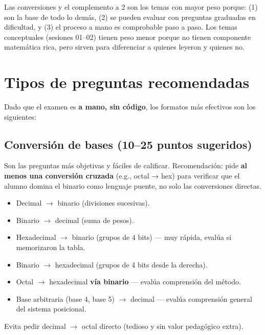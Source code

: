 \documentclass[12pt, oneside]{article}
\begin{document}
\begin{notaprofesor}
  Las conversiones y el complemento a 2 son los temas con mayor peso porque:
  (1) son la base de todo lo demás, (2) se pueden evaluar con preguntas
  graduadas en dificultad, y (3) el proceso a mano es comprobable paso a paso.
  Los temas conceptuales (sesiones 01–02) tienen peso menor porque no tienen
  componente matemática rica, pero sirven para diferenciar a quienes leyeron
  y quienes no.
\end{notaprofesor}

\newpage

\section{Tipos de preguntas recomendadas}

Dado que el examen es \textbf{a mano, sin código}, los formatos más efectivos
son los siguientes:

\subsection{Conversión de bases (10–25 puntos sugeridos)}

Son las preguntas más objetivas y fáciles de calificar.
Recomendación: pide \textbf{al menos una conversión cruzada} (e.g., octal → hex)
para verificar que el alumno domina el binario como lenguaje puente, no solo
las conversiones directas.

\begin{notaprofesor}
  \begin{itemize}
    \item Decimal $\to$ binario (divisiones sucesivas).
    \item Binario $\to$ decimal (suma de pesos).
    \item Hexadecimal $\to$ binario (grupos de 4 bits) — muy rápida, evalúa si
          memorizaron la tabla.
    \item Binario $\to$ hexadecimal (grupos de 4 bits desde la derecha).
    \item Octal $\to$ hexadecimal \textbf{vía binario} — evalúa comprensión del método.
    \item Base arbitraria (base 4, base 5) $\to$ decimal — evalúa comprensión general
          del sistema posicional.
  \end{itemize}
  Evita pedir decimal $\to$ octal directo (tedioso y sin valor pedagógico extra).
\end{notaprofesor}
\end{document}
